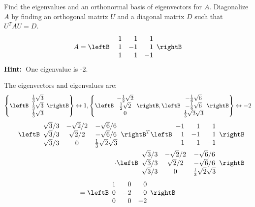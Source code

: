 \begin{enumialphparenastyle}
\begin{ex} Find the eigenvalues and an orthonormal basis of eigenvectors for $A.$
Diagonalize $A$ by finding an orthogonal matrix $U$ and a diagonal matrix $D$
such that $U^{T}AU=D$. 
\begin{equation*}
A=\leftB 
\begin{array}{rrr}
-1 & 1 & 1 \\ 
1 & -1 & 1 \\ 
1 & 1 & -1
\end{array}
\rightB 
\end{equation*}
\textbf{Hint:\ }One eigenvalue is -2.
\begin{sol}
The eigenvectors and eigenvalues are:
\[
\left\{ \leftB
\begin{array}{c}
\frac{1}{3}\sqrt{3} \\
\frac{1}{3}\sqrt{3} \\
\frac{1}{3}\sqrt{3}
\end{array}
\rightB \right\} \leftrightarrow 1,\left\{ \leftB
\begin{array}{c}
-\frac{1}{2}\sqrt{2} \\
\frac{1}{2}\sqrt{2} \\
0
\end{array}
\rightB ,\allowbreak \leftB
\begin{array}{c}
-\frac{1}{6}\sqrt{6} \\
-\frac{1}{6}\sqrt{6} \\
\frac{1}{3}\sqrt{2}\sqrt{3}
\end{array}
\rightB \right\} \leftrightarrow -2
\]
\begin{eqnarray*}
&&\leftB
\begin{array}{ccc}
\sqrt{3}/3 & -\sqrt{2}/2 & -\sqrt{6}/6 \\
\sqrt{3}/3 & \sqrt{2}/2 & -\sqrt{6}/6 \\
\sqrt{3}/3 & 0 & \frac{1}{3}\sqrt{2}\sqrt{3}
\end{array}
\rightB^{T}\leftB
\begin{array}{rrr}
-1 & 1 & 1 \\
1 & -1 & 1 \\
1 & 1 & -1
\end{array}
\rightB  \\
&&\cdot \leftB
\begin{array}{ccc}
\sqrt{3}/3 & -\sqrt{2}/2 & -\sqrt{6}/6 \\
\sqrt{3}/3 & \sqrt{2}/2 & -\sqrt{6}/6 \\
\sqrt{3}/3 & 0 & \frac{1}{3}\sqrt{2}\sqrt{3}
\end{array}
\rightB
\end{eqnarray*}
\[
=\leftB
\begin{array}{rrr}
1 & 0 & 0 \\
0 & -2 & 0 \\
0 & 0 & -2
\end{array}
\rightB
\]
\end{sol}
\end{ex}


\end{enumialphparenastyle}
